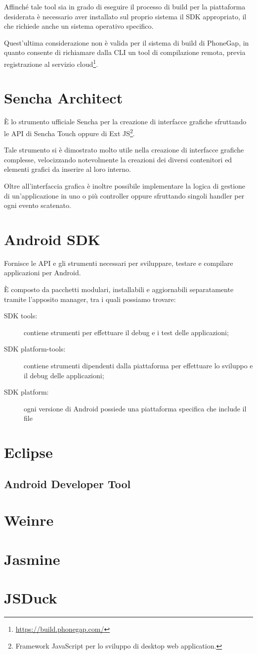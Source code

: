 Affinché tale tool sia in grado di eseguire il processo di build per la piattaforma desiderata è necessario aver installato sul proprio sistema il \ac{SDK} appropriato, il che richiede anche un sistema operativo specifico.

Quest'ultima considerazione non è valida per il sistema di build di PhoneGap, in quanto consente di richiamare dalla \ac{CLI} un tool di compilazione remota, previa registrazione al servizio cloud\footnote{\url{https://build.phonegap.com/}}.

\section{Sencha Architect}
È lo strumento ufficiale Sencha per la creazione di interfacce grafiche sfruttando le \ac{API} di Sencha Touch oppure di Ext JS\footnote{Framework JavaScript per lo  sviluppo di desktop web application.}.

Tale strumento si è dimostrato molto utile nella creazione di interfacce grafiche complesse, velocizzando notevolmente la creazioni dei diversi contenitori ed elementi grafici da inserire al loro interno.

Oltre all'interfaccia grafica è inoltre possibile implementare la logica di gestione di un'applicazione in uno o più controller oppure sfruttando singoli handler per ogni evento scatenato.

\section{Android SDK}
Fornisce le \ac{API} e gli strumenti necessari per sviluppare, testare e compilare applicazioni per Android.

È composto da pacchetti modulari, installabili e aggiornabili separatamente tramite l'apposito manager, tra i quali possiamo trovare:
\begin{description}
\item[SDK tools:] contiene strumenti per effettuare il debug e i test delle applicazioni;
\item[SDK platform-tools:] contiene strumenti dipendenti dalla piattaforma per effettuare lo sviluppo e il debug delle applicazioni;
\item[SDK platform:] ogni versione di Android possiede una piattaforma specifica che include il file  
\end{description}

\section{Eclipse}

\subsection{Android Developer Tool}


\section{Weinre}

\section{Jasmine}

\section{JSDuck}